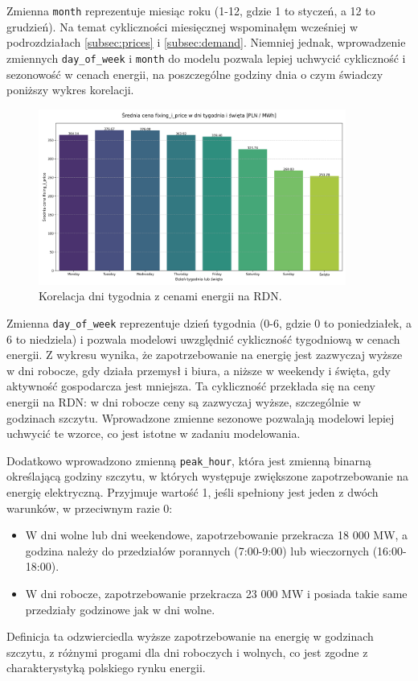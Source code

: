Zmienna \texttt{month} reprezentuje miesiąc roku (1-12, gdzie 1 to styczeń, a 12 to grudzień). Na temat cykliczności miesięcznej wspominałęm wcześniej w podrozdziałach \ref{subsec:prices} i \ref{subsec:demand}. Niemniej jednak, wprowadzenie zmiennych \texttt{day\_of\_week} i \texttt{month} do modelu pozwala lepiej uchwycić cykliczność i sezonowość w cenach energii, na poszczególne godziny dnia o czym świadczy poniższy wykres korelacji.

\begin{figure}[H]
    \centering
    \includegraphics[width=0.9\textwidth]{../plots/fixing_i_price_weekdays_holidays.png}
    \caption{Korelacja dni tygodnia z cenami energii na RDN.}
    \label{fig:seasonal-correlation}
\end{figure}

Zmienna \texttt{day\_of\_week} reprezentuje dzień tygodnia (0-6, gdzie 0 to poniedziałek, a 6 to niedziela) i pozwala modelowi uwzględnić cykliczność tygodniową w cenach energii. Z wykresu wynika, że zapotrzebowanie na energię jest zazwyczaj wyższe w dni robocze, gdy działa przemysł i biura, a niższe w weekendy i święta, gdy aktywność gospodarcza jest mniejsza. Ta cykliczność przekłada się na ceny energii na RDN: w dni robocze ceny są zazwyczaj wyższe, szczególnie w godzinach szczytu. Wprowadzone zmienne sezonowe pozwalają modelowi lepiej uchwycić te wzorce, co jest istotne w zadaniu modelowania.

Dodatkowo wprowadzono zmienną \texttt{peak\_hour}, która jest zmienną binarną określającą godziny szczytu, w których występuje zwiększone zapotrzebowanie na energię elektryczną. Przyjmuje wartość 1, jeśli spełniony jest jeden z dwóch warunków, w przeciwnym razie 0:
\begin{itemize}
    \item W dni wolne lub dni weekendowe, zapotrzebowanie przekracza 18 000 MW, a godzina należy do przedziałów porannych (7:00-9:00) lub wieczornych (16:00-18:00).
    \item W dni robocze, zapotrzebowanie przekracza 23 000 MW i posiada takie same przedziały godzinowe jak w dni wolne.
\end{itemize}
Definicja ta odzwierciedla wyższe zapotrzebowanie na energię w godzinach szczytu, z różnymi progami dla dni roboczych i wolnych, co jest zgodne z charakterystyką polskiego rynku energii.

